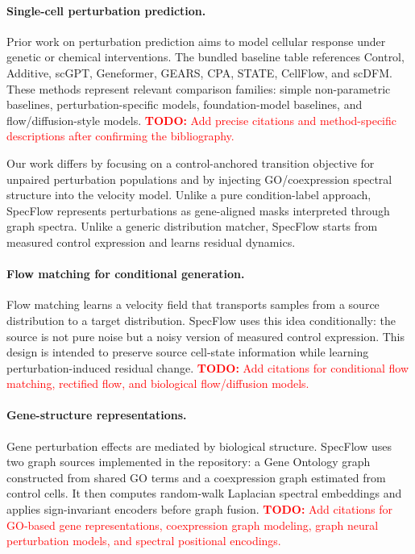 \documentclass[11pt]{article}
\newcommand{\method}{SpecFlow}
\newcommand{\todo}[1]{\textcolor{red}{\textbf{TODO:} #1}}
\begin{document}
\paragraph{Single-cell perturbation prediction.}
Prior work on perturbation prediction aims to model cellular response under genetic or chemical interventions.
The bundled baseline table references Control, Additive, scGPT, Geneformer, GEARS, CPA, STATE, CellFlow, and scDFM.
These methods represent relevant comparison families: simple non-parametric baselines, perturbation-specific models, foundation-model baselines, and flow/diffusion-style models.
\todo{Add precise citations and method-specific descriptions after confirming the bibliography.}

Our work differs by focusing on a control-anchored transition objective for unpaired perturbation populations and by injecting GO/coexpression spectral structure into the velocity model.
Unlike a pure condition-label approach, \method{} represents perturbations as gene-aligned masks interpreted through graph spectra.
Unlike a generic distribution matcher, \method{} starts from measured control expression and learns residual dynamics.

\paragraph{Flow matching for conditional generation.}
Flow matching learns a velocity field that transports samples from a source distribution to a target distribution.
\method{} uses this idea conditionally: the source is not pure noise but a noisy version of measured control expression.
This design is intended to preserve source cell-state information while learning perturbation-induced residual change.
\todo{Add citations for conditional flow matching, rectified flow, and biological flow/diffusion models.}

\paragraph{Gene-structure representations.}
Gene perturbation effects are mediated by biological structure.
\method{} uses two graph sources implemented in the repository: a Gene Ontology graph constructed from shared GO terms and a coexpression graph estimated from control cells.
It then computes random-walk Laplacian spectral embeddings and applies sign-invariant encoders before graph fusion.
\todo{Add citations for GO-based gene representations, coexpression graph modeling, graph neural perturbation models, and spectral positional encodings.}
\end{document}
